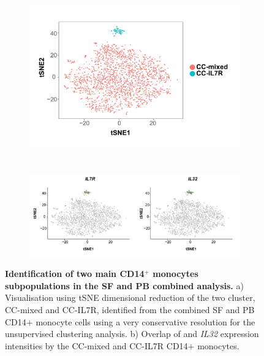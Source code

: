 \bigskip
\begin{figure}[H]
\centering
\begin{subfigure}[b]{0.60\textwidth}
\centering 
\includegraphics[width=\textwidth]{./Results3/pdfs/PSA_scRNAseq_tSNE_CC_mixed_and_IL7R}
\caption{}
\end{subfigure}
~
\begin{subfigure}[b]{0.75\textwidth} 
\centering
\includegraphics[width=\textwidth]{./Results3/pdfs/PSA_scRNAseq_CC_mixed_and_IL7R_overlay_markers}
\caption{}
\end{subfigure}
\caption[Identification of two main CD14$^+$ monocytes subpopulations in the SF and PB combined analysis]{\textbf{Identification of two main CD14$^+$ monocytes subpopulations in the SF and PB combined analysis.} a) Visualisation using tSNE dimensional reduction of the two cluster, CC-mixed and CC-IL7R, identified from the combined SF and PB CD14$+$ monocyte cells using a very conservative resolution for the unsupervised clustering analysis. b) Overlap of  and \textit{IL32} expression intensities by the CC-mixed and CC-IL7R CD14$+$ monocytes.}
\label{figure:PsA_scRNAseq_SF_an_PB_monocytes_identification_from_bulk}
\end{figure}




